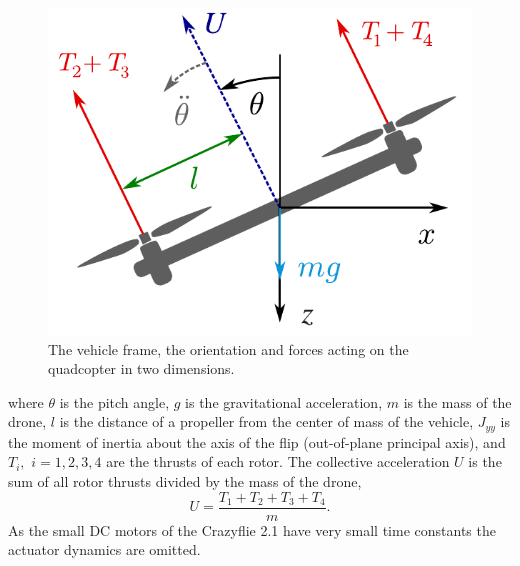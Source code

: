 \begin{figure}[b]
\centering
\includegraphics[width=.35\textwidth]{Fig/flip_frame_2.pdf}
\caption{The vehicle frame, the orientation and forces acting on the quadcopter in two dimensions.}\label{fig:flipframe}
\end{figure}

where $\theta$ is the pitch angle, $g$ is the gravitational acceleration, $m$ is the mass of the drone, $l$ is the distance of a propeller from the center of mass of the vehicle, $J_{yy}$ is the moment of inertia about the axis of the flip (out-of-plane principal axis), and $T_i,$ $i=1,2,3,4$ are the thrusts of each rotor. The collective acceleration $U$ is the sum of all rotor thrusts divided by the mass of the drone,
\begin{equation}
U = \frac{T_1 + T_2 + T_3 + T_4}{m}.
\end{equation}
As the small DC motors of the Crazyflie 2.1 have very small time constants the actuator dynamics are omitted.%


